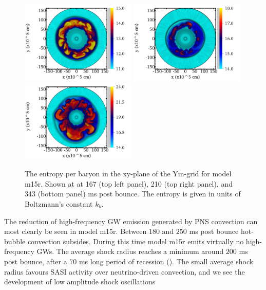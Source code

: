 \begin{figure}[ht]         
\centering                            
\includegraphics[width=0.49\textwidth]{./images/paper2/1.png}
\includegraphics[width=0.49\textwidth]{./images/paper2/2.png} \\
\includegraphics[width=0.49\textwidth]{./images/paper2/3.png}
\caption{The entropy per baryon in the xy-plane of the Yin-grid for model m15r. Shown at
at 167 (top left panel), 210 (top right panel), and 343 (bottom panel) ms post bounce. 
The entropy is given in units of Boltzmann's constant $k_b$. \label{figp2:sto}}
\end{figure}
The reduction of high-frequency GW emission generated by PNS convection can most clearly be seen in model
m15r. Between $180$ and $250$ ms post bounce hot-bubble convection subsides. During this time
model m15r emits virtually no high-frequency GWs. 
The average shock radius reaches a minimum around $200$ ms post bounce, after
a $70$ ms long period of recession (). The small average shock radius favours SASI activity over
neutrino-driven convection, and we see the development of low amplitude shock oscillations
